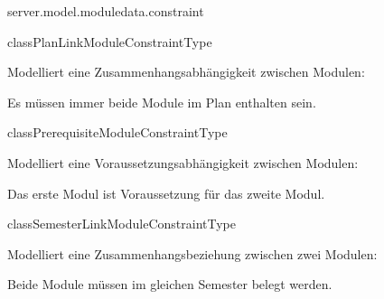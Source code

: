 \begin{texdocpackage}{server.model.moduledata.constraint}
\begin{texdocclass}{class}{PlanLinkModuleConstraintType}
\label{texdoclet:edu.kit.informatik.studyplan.server.model.moduledata.constraint.PlanLinkModuleConstraintType}
\begin{texdocclassintro}
Modelliert eine Zusammenhangsabhängigkeit zwischen Modulen: \texdocbr{}

 Es müssen immer beide Module im Plan enthalten sein.\end{texdocclassintro}
\begin{texdocclassconstructors}
\end{texdocclassconstructors}
\begin{texdocclassmethods}
\end{texdocclassmethods}
\end{texdocclass}


\begin{texdocclass}{class}{PrerequisiteModuleConstraintType}
\label{texdoclet:edu.kit.informatik.studyplan.server.model.moduledata.constraint.PrerequisiteModuleConstraintType}
\begin{texdocclassintro}
Modelliert eine Voraussetzungsabhängigkeit zwischen Modulen:\texdocbr{}

 Das erste Modul ist Voraussetzung für das zweite Modul.\end{texdocclassintro}
\begin{texdocclassconstructors}
\end{texdocclassconstructors}
\begin{texdocclassmethods}
\end{texdocclassmethods}
\end{texdocclass}


\begin{texdocclass}{class}{SemesterLinkModuleConstraintType}
\label{texdoclet:edu.kit.informatik.studyplan.server.model.moduledata.constraint.SemesterLinkModuleConstraintType}
\begin{texdocclassintro}
Modelliert eine Zusammenhangsbeziehung zwischen zwei Modulen:\texdocbr{}

 Beide Module müssen im gleichen Semester belegt werden.\end{texdocclassintro}
\begin{texdocclassconstructors}
\end{texdocclassconstructors}
\begin{texdocclassmethods}
\end{texdocclassmethods}
\end{texdocclass}


\end{texdocpackage}
